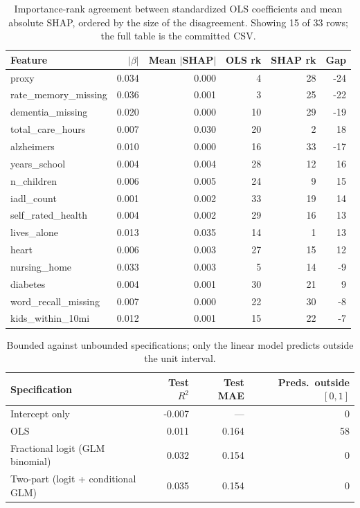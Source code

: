 \documentclass[9pt,twoside]{pnas-new}
\begin{document}
\begin{table}[!ht]
\centering
\caption{Importance-rank agreement between standardized OLS coefficients and mean absolute SHAP, ordered by the size of the disagreement. Showing 15 of 33 rows; the full table is the committed CSV.}
\label{tab:b-ranks}
\footnotesize
\begin{tabular}{lrrrrr}
\toprule
Feature & $|\beta|$ & Mean $|$SHAP$|$ & OLS rk & SHAP rk & Gap \\
\midrule
proxy & 0.034 & 0.000 & 4 & 28 & -24 \\
rate\_memory\_missing & 0.036 & 0.001 & 3 & 25 & -22 \\
dementia\_missing & 0.020 & 0.000 & 10 & 29 & -19 \\
total\_care\_hours & 0.007 & 0.030 & 20 & 2 & 18 \\
alzheimers & 0.010 & 0.000 & 16 & 33 & -17 \\
years\_school & 0.004 & 0.004 & 28 & 12 & 16 \\
n\_children & 0.006 & 0.005 & 24 & 9 & 15 \\
iadl\_count & 0.001 & 0.002 & 33 & 19 & 14 \\
self\_rated\_health & 0.004 & 0.002 & 29 & 16 & 13 \\
lives\_alone & 0.013 & 0.035 & 14 & 1 & 13 \\
heart & 0.006 & 0.003 & 27 & 15 & 12 \\
nursing\_home & 0.033 & 0.003 & 5 & 14 & -9 \\
diabetes & 0.004 & 0.001 & 30 & 21 & 9 \\
word\_recall\_missing & 0.007 & 0.000 & 22 & 30 & -8 \\
kids\_within\_10mi & 0.012 & 0.001 & 15 & 22 & -7 \\
\bottomrule
\end{tabular}
\end{table}

\begin{table}[!ht]
\centering
\caption{Bounded against unbounded specifications; only the linear model predicts outside the unit interval.}
\label{tab:b-twopart}
\small
\begin{tabular}{lrrr}
\toprule
Specification & Test $R^2$ & Test MAE & Preds.\ outside $[0,1]$ \\
\midrule
Intercept only & -0.007 & --- & 0 \\
OLS & 0.011 & 0.164 & 58 \\
Fractional logit (GLM binomial) & 0.032 & 0.154 & 0 \\
Two-part (logit + conditional GLM) & 0.035 & 0.154 & 0 \\
\bottomrule
\end{tabular}
\end{table}
\end{document}
